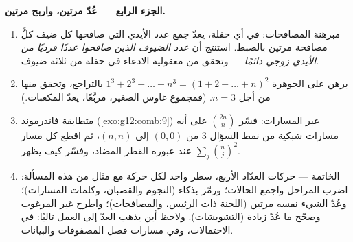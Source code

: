 \begin{problem}
\medskip
\noindent\textbf{الجزء الرابع --- عُدّ مرتين، واربح مرتين.}
\begin{enumerate}[resume]
  \item مبرهنة المصافحات: في أي حفلة، يعدّ جمع عدد
        الأيدي التي صافحها كل ضيف كلَّ مصافحة
        مرتين بالضبط. استنتج أن \emph{عدد الضيوف
        الذين صافحوا عددًا فرديًا من الأيدي زوجي دائمًا} ---
        وتحقق من معقولية الادعاء في حفلة من ثلاثة ضيوف.
  \item برهن على الجوهرة
        $1^3 + 2^3 + \dots + n^3 = (1 + 2 + \dots + n)^2$
        بالتراجع، وتحقق منها من أجل $n = 3$. (فمجموع غاوس
        الصغير، مربَّعًا، يعدّ المكعبات.)
  \item متطابقة فاندرموند (\cref{exo:g12:comb:9}) عبر
        المسارات: فسّر $\binom{2n}{n}$ على أنه مسارات شبكية
        من نمط السؤال 3 من $(0,0)$ إلى $(n,n)$، ثم اقطع كل
        مسار عند عبوره القطر المضاد، وفسّر
        كيف يظهر $\sum_j \binom nj^2$.
  \item الخاتمة --- حركات العدّاد الأربع، سطر واحد لكل حركة مع
        مثال من هذه المسألة: اضرب المراحل واجمع
        الحالات؛ ورمّز بذكاء (النجوم والقضبان، وكلمات المسارات)؛
        وعُدّ الشيء نفسه مرتين (اللجنة ذات الرئيس، والمصافحات)؛
        واطرح غير المرغوب وصحّح ما عُدّ زيادة (التشويشات). ولاحظ أين
        يذهب العدّ إلى العمل تاليًا: في الاحتمالات، وفي مسارات
        فصل المصفوفات والبيانات.
\end{enumerate}
\end{problem}
